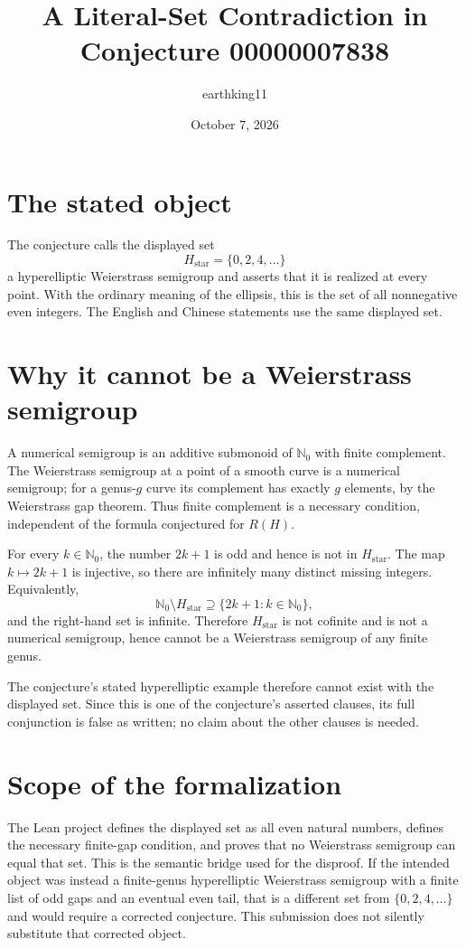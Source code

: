 \documentclass[11pt]{article}
\title{A Literal-Set Contradiction in Conjecture 00000007838}
\author{earthking11}
\date{October 7, 2026}
\begin{document}
\maketitle

\section*{The stated object}
The conjecture calls the displayed set
\[
  H_{\mathrm{star}}=\{0,2,4,\ldots\}
\]
a hyperelliptic Weierstrass semigroup and asserts that it is realized at every point. With the ordinary meaning of the ellipsis, this is the set of all nonnegative even integers. The English and Chinese statements use the same displayed set.

\section*{Why it cannot be a Weierstrass semigroup}
A numerical semigroup is an additive submonoid of $\mathbb N_0$ with finite complement. The Weierstrass semigroup at a point of a smooth curve is a numerical semigroup; for a genus-$g$ curve its complement has exactly $g$ elements, by the Weierstrass gap theorem. Thus finite complement is a necessary condition, independent of the formula conjectured for $R(H)$.

For every $k\in\mathbb N_0$, the number $2k+1$ is odd and hence is not in $H_{\mathrm{star}}$. The map $k\mapsto 2k+1$ is injective, so there are infinitely many distinct missing integers. Equivalently,
\[
  \mathbb N_0\setminus H_{\mathrm{star}}
  \supseteq \{2k+1:k\in\mathbb N_0\},
\]
and the right-hand set is infinite. Therefore $H_{\mathrm{star}}$ is not cofinite and is not a numerical semigroup, hence cannot be a Weierstrass semigroup of any finite genus.

The conjecture's stated hyperelliptic example therefore cannot exist with the displayed set. Since this is one of the conjecture's asserted clauses, its full conjunction is false as written; no claim about the other clauses is needed.

\section*{Scope of the formalization}
The Lean project defines the displayed set as all even natural numbers, defines the necessary finite-gap condition, and proves that no Weierstrass semigroup can equal that set. This is the semantic bridge used for the disproof. If the intended object was instead a finite-genus hyperelliptic Weierstrass semigroup with a finite list of odd gaps and an eventual even tail, that is a different set from $\{0,2,4,\ldots\}$ and would require a corrected conjecture. This submission does not silently substitute that corrected object.
\end{document}
